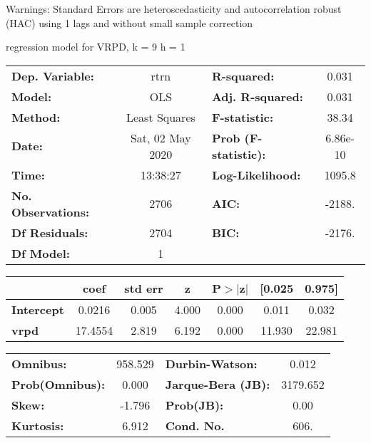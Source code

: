 Warnings: \newline
 [1] Standard Errors are heteroscedasticity and autocorrelation robust (HAC) using 1 lags and without small sample correction\ 

regression model for VRPD, k = 9 h = 1\begin{center}
\begin{tabular}{lclc}
\toprule
\textbf{Dep. Variable:}    &       rtrn       & \textbf{  R-squared:         } &     0.031   \\
\textbf{Model:}            &       OLS        & \textbf{  Adj. R-squared:    } &     0.031   \\
\textbf{Method:}           &  Least Squares   & \textbf{  F-statistic:       } &     38.34   \\
\textbf{Date:}             & Sat, 02 May 2020 & \textbf{  Prob (F-statistic):} &  6.86e-10   \\
\textbf{Time:}             &     13:38:27     & \textbf{  Log-Likelihood:    } &    1095.8   \\
\textbf{No. Observations:} &        2706      & \textbf{  AIC:               } &    -2188.   \\
\textbf{Df Residuals:}     &        2704      & \textbf{  BIC:               } &    -2176.   \\
\textbf{Df Model:}         &           1      & \textbf{                     } &             \\
\bottomrule
\end{tabular}
\begin{tabular}{lcccccc}
                   & \textbf{coef} & \textbf{std err} & \textbf{z} & \textbf{P$> |$z$|$} & \textbf{[0.025} & \textbf{0.975]}  \\
\midrule
\textbf{Intercept} &       0.0216  &        0.005     &     4.000  &         0.000        &        0.011    &        0.032     \\
\textbf{vrpd}      &      17.4554  &        2.819     &     6.192  &         0.000        &       11.930    &       22.981     \\
\bottomrule
\end{tabular}
\begin{tabular}{lclc}
\textbf{Omnibus:}       & 958.529 & \textbf{  Durbin-Watson:     } &    0.012  \\
\textbf{Prob(Omnibus):} &   0.000 & \textbf{  Jarque-Bera (JB):  } & 3179.652  \\
\textbf{Skew:}          &  -1.796 & \textbf{  Prob(JB):          } &     0.00  \\
\textbf{Kurtosis:}      &   6.912 & \textbf{  Cond. No.          } &     606.  \\
\bottomrule
\end{tabular}
\end{center}

